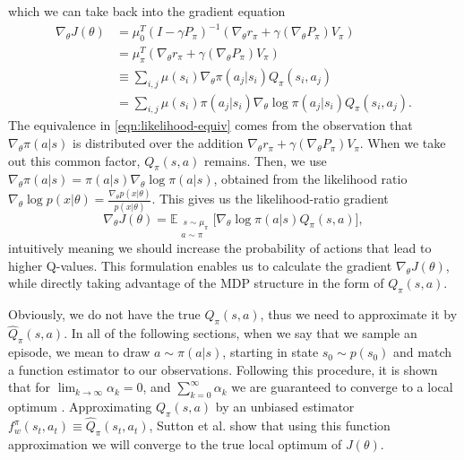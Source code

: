 \documentclass[conference, final]{IEEEtran}
\begin{document}
which we can take back into the gradient equation 
\begin{align}
	\nabla_\theta J(\theta) &= \mu_0^T (I - \gamma P_\pi)^{-1} (\nabla_\theta r_\pi + \gamma (\nabla_\theta P_\pi) V_\pi) \nonumber
	\\ &= \mu_\pi^T (\nabla_\theta r_\pi + \gamma (\nabla_\theta P_\pi) V_\pi) \nonumber
	\\ &\equiv \sum\nolimits_{i,j} \mu(s_i) \nabla_\theta\pi(a_j|s_i) Q_\pi(s_i,a_j) \label{eqn:likelihood-equiv}
	\\ &= \sum\nolimits_{i,j} \mu(s_i) \pi(a_j|s_i) \nabla_\theta\log\pi(a_j|s_i) Q_\pi(s_i,a_j). \nonumber
\end{align}
The equivalence in \eqref{eqn:likelihood-equiv} comes from the observation that $\nabla_\theta \pi(a|s)$ is distributed over the addition $\nabla_\theta r_\pi + \gamma (\nabla_\theta P_\pi) V_\pi$.
When we take out this common factor, $Q_\pi(s,a)$ remains.
Then, we use $\nabla_\theta \pi(a|s) = \pi(a|s)\nabla_\theta\log\pi(a|s)$, obtained from the likelihood ratio $\nabla_\theta \log p(x|\theta) = \frac{\nabla_\theta p(x|\theta)}{p(x|\theta)}$. 
This gives us the likelihood-ratio gradient
\begin{equation}
	\nabla_\theta J(\theta) = \mathbb{E}_{\substack{\ s \sim \mu_\pi \\a \sim \pi}} \Big[\nabla_\theta{\log\pi(a|s)}Q_\pi(s,a)\Big],
	\label{eqn:like-grad}
\end{equation}
intuitively meaning we should increase the probability of actions that lead to higher Q-values.
This formulation enables us to calculate the gradient $\nabla_\theta J(\theta)$, while directly taking advantage of the MDP structure in the form of $Q_\pi(s,a)$.

Obviously, we do not have the true $Q_\pi(s,a)$, thus we need to approximate it by $\hat{Q}_\pi(s,a)$. 
In all of the following sections, when we say that we sample an episode, we mean to draw $a \sim \pi(a|s)$, starting in state $s_0 \sim p(s_0)$ and match a function estimator to our observations.
Following this procedure, it is shown that for $\lim_{k\to\infty}\alpha_k = 0$, and $\sum_{k=0}^\infty \alpha_k$ we are guaranteed to converge to a local optimum \cite{Sutton:1999:PGM:3009657.3009806}.
Approximating $Q_\pi(s,a)$ by an unbiased estimator $f_w^\pi(s_t, a_t) \equiv \hat{Q}_\pi(s_t, a_t)$, Sutton et al. \cite{Sutton:1999:PGM:3009657.3009806} show that using this function approximation we will converge to the true local optimum of $J(\theta)$.
\end{document}
